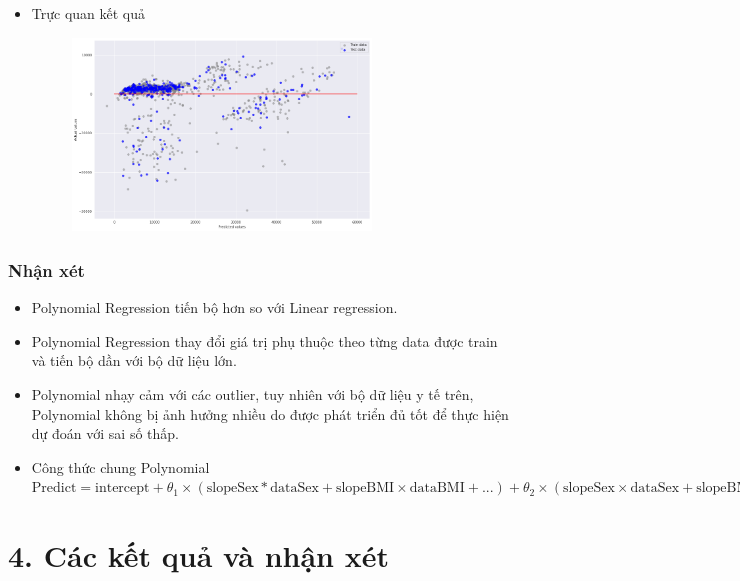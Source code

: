 \documentclass{article}
\begin{document}
\begin{itemize}
\begin{itemize}
\begin{figure}[H]
			\end{figure}
		\end{itemize}
		\item Trực quan kết quả
		\begin{figure}[H]
			\centering
			\includegraphics[width=0.75\textwidth]{images/polynomial_reg/poly_reg_plot.png}
		\end{figure}
	\end{itemize}
	\subsubsection{Nhận xét}
	\begin{itemize}
		\item Polynomial Regression tiến bộ hơn so với Linear regression.
		\item Polynomial Regression thay đổi giá trị phụ thuộc theo từng data được train và tiến bộ dần với bộ dữ liệu lớn.
		\item Polynomial nhạy cảm với các outlier, tuy nhiên với bộ dữ liệu y tế trên, Polynomial không bị ảnh hưởng nhiều do được phát triển đủ tốt để thực hiện dự đoán với sai số thấp.
		\item Công thức chung Polynomial $\text{Predict} = \text{intercept} + \theta_1 \times (\text{slopeSex} * \text{dataSex} + \text{slopeBMI} \times \text{dataBMI} + ... ) + \theta_2 \times (\text{slopeSex} \times \text{dataSex} + \text{slopeBMI} \times \text{dataBMI} + ... ) + \theta_3 * (\text{slopeSex} \times \text{dataSex} + \text{slopeBMI} \times \text{dataBMI} + ... )$
	\end{itemize}
	\section{4. Các kết quả và nhận xét}
	
	\nocite{*}
	\newpage\cleardoublepage
	
	
\end{document}

